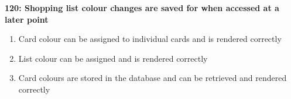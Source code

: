 \documentclass[10pt,onecolumn]{witseiepaper}
\begin{document}
\textbf{120: Shopping list colour changes are saved for when accessed at a later point}

\begin{enumerate}
	\item Card colour can be assigned to individual cards and is rendered correctly
	\item List colour can be assigned and is rendered correctly
	\item Card colours are stored in the database and can be retrieved and rendered correctly
\end{enumerate}
\end{document}

